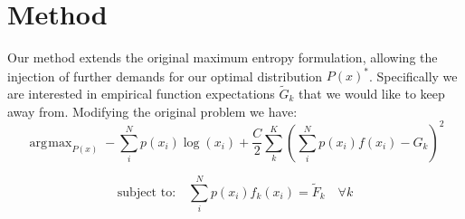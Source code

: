\documentclass[letterpaper]{article}
\DeclareMathOperator*{\argmax}{\arg\!\max}
\begin{document}
\section{Method}
	Our method extends the original maximum entropy formulation, allowing the injection of further demands for our optimal distribution $P(x)^*$. Specifically we are interested in empirical function expectations $\widetilde{G}_k$ that we would like to keep away from. Modifying the original problem we have:  
	\begin{equation}
	\argmax_{P(x)} -\sum_i^N p(x_i)\log(x_i) + \frac{C}{2}\sum_k^K(\sum_i^N p(x_i)f(x_i) - G_k)^2
	\end{equation}
	

	\begin{equation}
	\text{subject to:} \quad \sum_i^N p(x_i)f_k(x_i) = \widetilde{F}_k \quad \forall k \label{eqn:match_constraint}
	\end{equation}
\end{document}
